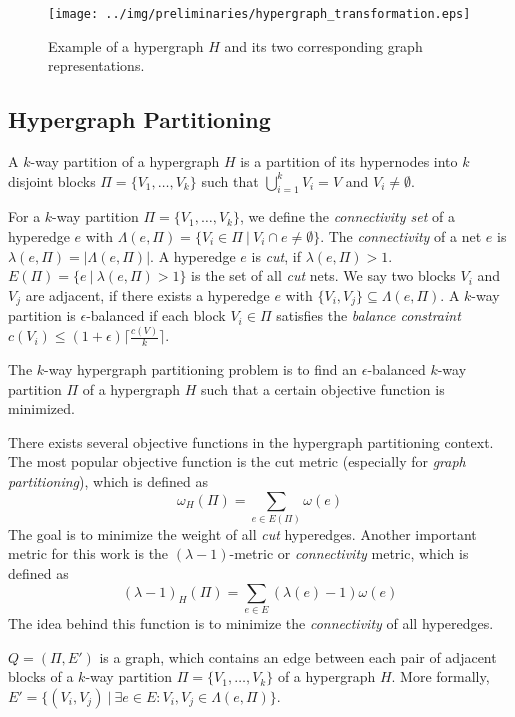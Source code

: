\begin{figure}
\centering
\texttt{[image: ../img/preliminaries/hypergraph\_transformation.eps]}
\caption{Example of a hypergraph $H$ and its two corresponding graph representations.} 
\label{img:hypergraph_transformation}
\end{figure}

\subsection{Hypergraph Partitioning}
\label{sec:hypergraph_partitioning}

\begin{definition}
A $k$-way partition of a hypergraph $H$ is a partition of its hypernodes into
$k$ disjoint blocks $\Pi = \{V_1,\ldots,V_k\}$ such that $\bigcup_{i=1}^{k} V_i = V$
and $V_i \neq \emptyset$.
\label{def:kway_partition}
\end{definition}

For a $k$-way partition $\Pi = \{V_1,\ldots,V_k\}$, we define the \emph{connectivity set} of a
hyperedge $e$ with $\Lambda(e,\Pi) = \{V_i \in \Pi\ |\ V_i \cap e \neq \emptyset\}$. The \emph{connectivity}
of a net $e$ is $\lambda(e,\Pi) = |\Lambda(e,\Pi)|$. A hyperedge $e$ is \emph{cut}, if
$\lambda(e,\Pi) > 1$. $E(\Pi) = \{e\ |\ \lambda(e,\Pi) > 1\}$ is the set of all \emph{cut} 
nets. We say two blocks $V_i$ and $V_j$ are adjacent, if there exists a hyperedge
$e$ with $\{V_i,V_j\} \subseteq \Lambda(e,\Pi)$. 
A $k$-way partition is $\epsilon$-balanced 
if each block $V_i \in \Pi$ satisfies the \emph{balance constraint} 
$c(V_i) \le (1+\epsilon)\lceil\frac{c(V)}{k}\rceil$.

\begin{definition}
The $k$-way hypergraph partitioning problem is to find an $\epsilon$-balanced $k$-way
partition $\Pi$ of a hypergraph $H$ such that a certain objective function is minimized.
\label{def:kway_partitioning_problem}
\end{definition}

There exists several objective functions in the hypergraph partitioning context. 
The most popular objective function 
is the $\text{cut}$ metric (especially for \emph{graph partitioning}), which is defined as
\[\omega_H(\Pi) = \sum_{e \in E(\Pi)} \omega(e)\]
The goal is to minimize the weight of all \emph{cut} hyperedges. Another important metric
for this work is the $(\lambda - 1)$-metric or \emph{connectivity} metric, 
which is defined as
\[(\lambda - 1)_H(\Pi) = \sum_{e \in E} (\lambda(e) - 1)\omega(e)\]
The idea behind this function is to minimize the \emph{connectivity} of all hyperedges.

\begin{definition}
$Q = (\Pi,E')$ is a graph, which contains an edge between each pair of 
adjacent blocks of a $k$-way partition $\Pi = \{V_1,\ldots,V_k\}$ 
of a hypergraph $H$. More formally, 
$E' = \{(V_i,V_j)\ |\ \exists e \in E: V_i,V_j \in \Lambda(e,\Pi)\}$.
\label{def:quotient_graph}
\end{definition}